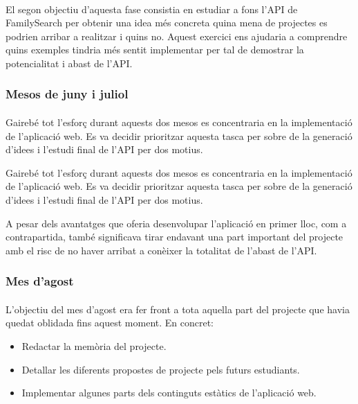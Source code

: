             \paragraph{}
            El segon objectiu d’aquesta fase consistia en estudiar a fons l'\gls{API} de FamilySearch per obtenir una idea més concreta quina mena de projectes es podrien arribar a realitzar i quins no. Aquest exercici ens ajudaria a comprendre quins exemples tindria més sentit implementar per tal de demostrar la potencialitat i abast de l'\gls{API}.

        \subsubsection{Mesos de juny i juliol}

            \paragraph{}
            Gairebé tot l’esforç durant aquests dos mesos es concentraria en la implementació de l’aplicació web. Es va decidir prioritzar aquesta tasca per sobre de la generació d'idees i l'estudi final de l'\gls{API} per dos motius.

            Gairebé tot l’esforç durant aquests dos mesos es concentraria en la implementació de l’aplicació web. Es va decidir prioritzar aquesta tasca per sobre de la generació d'idees i l'estudi final de l'\gls{API} per dos motius.

            A pesar dels avantatges que oferia desenvolupar l'aplicació en primer lloc, com a contrapartida, també significava tirar endavant una part important del projecte amb el risc de no haver arribat a conèixer la totalitat de l'abast de l'\gls{API}.

        \subsubsection{Mes d'agost}

            \paragraph{}
            L'objectiu del mes d'agost era fer front a tota aquella part del projecte que havia quedat oblidada fins aquest moment. En concret:

            \begin{itemize}
                \item Redactar la memòria del projecte.
                \item Detallar les diferents propostes de projecte pels futurs estudiants.
                \item Implementar algunes parts dels continguts estàtics de l'aplicació web.
            \end{itemize}

